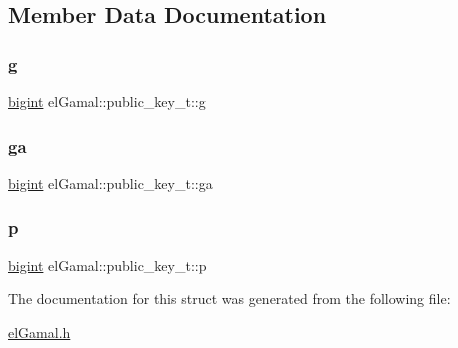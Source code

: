 \subsection{Member Data Documentation}
\mbox{\label{structelGamal_1_1public__key__t_aa54f804adb7e54538f1e34e7737167e7}} 
\subsubsection{\texorpdfstring{g}{g}}
{\footnotesize\ttfamily \mbox{\hyperlink{namespaceelGamal_ab2883bf41ce8d738e2428c8ae81b0245}{bigint}} el\+Gamal\+::public\+\_\+key\+\_\+t\+::g}

\mbox{\label{structelGamal_1_1public__key__t_ad3a62139e6cffaffbb03178eff18ea76}} 
\subsubsection{\texorpdfstring{ga}{ga}}
{\footnotesize\ttfamily \mbox{\hyperlink{namespaceelGamal_ab2883bf41ce8d738e2428c8ae81b0245}{bigint}} el\+Gamal\+::public\+\_\+key\+\_\+t\+::ga}

\mbox{\label{structelGamal_1_1public__key__t_a0f62fb91be391d0ca4abfa147626a0c8}} 
\subsubsection{\texorpdfstring{p}{p}}
{\footnotesize\ttfamily \mbox{\hyperlink{namespaceelGamal_ab2883bf41ce8d738e2428c8ae81b0245}{bigint}} el\+Gamal\+::public\+\_\+key\+\_\+t\+::p}



The documentation for this struct was generated from the following file\+:\begin{DoxyCompactItemize}
\item 
\mbox{\hyperlink{elGamal_8h}{el\+Gamal.\+h}}\end{DoxyCompactItemize}
